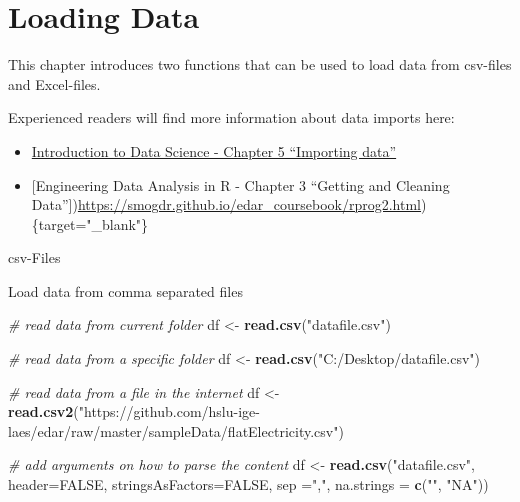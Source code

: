 \documentclass[
]{book}
\newenvironment{Shaded}{\begin{snugshade}}{\end{snugshade}}
\newcommand{\CommentTok}[1]{\textcolor[rgb]{0.56,0.35,0.01}{\textit{#1}}}
\newcommand{\DataTypeTok}[1]{\textcolor[rgb]{0.13,0.29,0.53}{#1}}
\newcommand{\KeywordTok}[1]{\textcolor[rgb]{0.13,0.29,0.53}{\textbf{#1}}}
\newcommand{\NormalTok}[1]{#1}
\newcommand{\OtherTok}[1]{\textcolor[rgb]{0.56,0.35,0.01}{#1}}
\newcommand{\StringTok}[1]{\textcolor[rgb]{0.31,0.60,0.02}{#1}}
\let\oldShaded\Shaded
\let\endoldShaded\endShaded
\renewenvironment{Shaded}{\footnotesize\oldShaded}{\endoldShaded}
\begin{document}
\hypertarget{loading-data}{%
\chapter{Loading Data}\label{loading-data}}

This chapter introduces two functions that can be used to load data from csv-files and Excel-files.

Experienced readers will find more information about data imports here:

\begin{itemize}
\item
  \href{https://rafalab.github.io/dsbook/importing-data.html}{Introduction to Data Science - Chapter 5 ``Importing data''}
\item
  {[}Engineering Data Analysis in R - Chapter 3 ``Getting and Cleaning Data''{]})\url{https://smogdr.github.io/edar_coursebook/rprog2.html})\{target="\_blank"\}
\end{itemize}

csv-Files

Load data from comma separated files

\begin{Shaded}
\begin{Highlighting}[]
\CommentTok{# read data from current folder}
\NormalTok{df <-}\StringTok{ }\KeywordTok{read.csv}\NormalTok{(}\StringTok{"datafile.csv"}\NormalTok{)}

\CommentTok{# read data from a specific folder}
\NormalTok{df <-}\StringTok{ }\KeywordTok{read.csv}\NormalTok{(}\StringTok{"C:/Desktop/datafile.csv"}\NormalTok{)}

\CommentTok{# read data from a file in the internet}
\NormalTok{df <-}\StringTok{ }\KeywordTok{read.csv2}\NormalTok{(}\StringTok{"https://github.com/hslu-ige-laes/edar/raw/master/sampleData/flatElectricity.csv"}\NormalTok{)}

\CommentTok{# add arguments on how to parse the content}
\NormalTok{df <-}\StringTok{ }\KeywordTok{read.csv}\NormalTok{(}\StringTok{"datafile.csv"}\NormalTok{,}
               \DataTypeTok{header=}\OtherTok{FALSE}\NormalTok{,}
               \DataTypeTok{stringsAsFactors=}\OtherTok{FALSE}\NormalTok{,}
               \DataTypeTok{sep =}\StringTok{","}\NormalTok{,}
               \DataTypeTok{na.strings =} \KeywordTok{c}\NormalTok{(}\StringTok{""}\NormalTok{, }\StringTok{"NA"}\NormalTok{))}
\end{Highlighting}
\end{Shaded}
\end{document}

